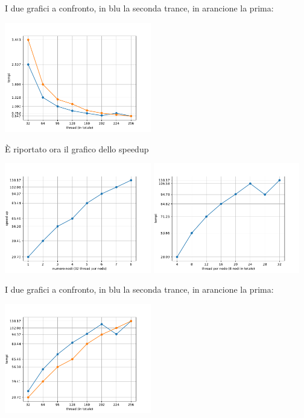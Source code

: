 \documentclass[12pt,openany]{report}
\begin{document}
I due grafici a confronto, in blu la seconda trance, in arancione la prima:
\begin{center}
    \includegraphics[width=0.48\textwidth ]{images/tempi_MISTO_MT.pdf}
\end{center}
È riportato ora il grafico dello speedup
\begin{center}
    \includegraphics[width=0.48\textwidth ]{images/speedup_MISTO_M.pdf}
    \includegraphics[width=0.48\textwidth ]{images/speedup_MISTO_T.pdf}
\end{center}
I due grafici a confronto, in blu la seconda trance, in arancione la prima:
\begin{center}
    \includegraphics[width=0.48\textwidth ]{images/speedup_MISTO_MT.pdf}
\end{center}
\end{document}
